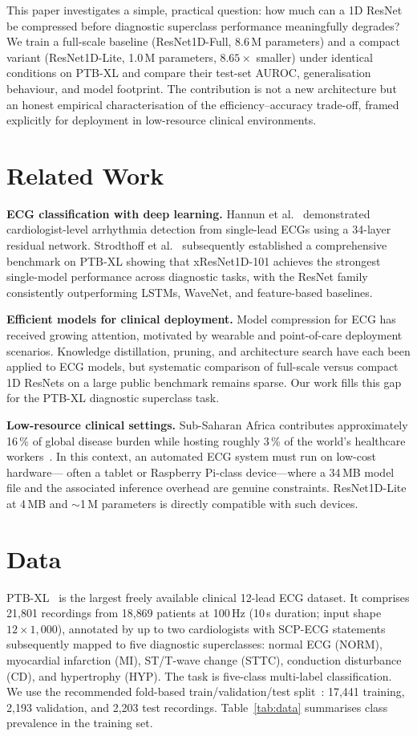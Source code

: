 \documentclass[11pt]{article}
\begin{document}
This paper investigates a simple, practical question: how much can a 1D
ResNet be compressed before diagnostic superclass performance meaningfully
degrades? We train a full-scale baseline (ResNet1D-Full, 8.6\,M parameters)
and a compact variant (ResNet1D-Lite, 1.0\,M parameters, $8.65\times$
smaller) under identical conditions on PTB-XL and compare their test-set
AUROC, generalisation behaviour, and model footprint. The contribution is
not a new architecture but an honest empirical characterisation of the
efficiency--accuracy trade-off, framed explicitly for deployment in
low-resource clinical environments.

\section{Related Work}
\textbf{ECG classification with deep learning.} Hannun et
al.~\cite{hannun2019} demonstrated cardiologist-level arrhythmia detection
from single-lead ECGs using a 34-layer residual network. Strodthoff et
al.~\cite{strodthoff2021} subsequently established a comprehensive benchmark
on PTB-XL showing that xResNet1D-101 achieves the strongest single-model
performance across diagnostic tasks, with the ResNet family consistently
outperforming LSTMs, WaveNet, and feature-based baselines.

\noindent\textbf{Efficient models for clinical deployment.}
Model compression for ECG has received growing attention, motivated by
wearable and point-of-care deployment scenarios. Knowledge distillation,
pruning, and architecture search have each been applied to ECG models,
but systematic comparison of full-scale versus compact 1D ResNets on a
large public benchmark remains sparse. Our work fills this gap for the
PTB-XL diagnostic superclass task.

\noindent\textbf{Low-resource clinical settings.}
Sub-Saharan Africa contributes approximately 16\,\% of global disease
burden while hosting roughly 3\,\% of the world's healthcare workers~\cite{who2021}.
In this context, an automated ECG system must run on low-cost hardware---
often a tablet or Raspberry Pi-class device---where a 34\,MB model file and
the associated inference overhead are genuine constraints. ResNet1D-Lite
at 4\,MB and $\sim$1\,M parameters is directly compatible with such devices.

\section{Data}
PTB-XL~\cite{wagner2020ptbxl} is the largest freely available clinical
12-lead ECG dataset. It comprises 21{,}801 recordings from 18{,}869 patients
at 100\,Hz (10\,s duration; input shape $12\times1{,}000$), annotated by
up to two cardiologists with SCP-ECG statements subsequently mapped to five
diagnostic superclasses: normal ECG (NORM), myocardial infarction (MI),
ST/T-wave change (STTC), conduction disturbance (CD), and hypertrophy (HYP).
The task is five-class multi-label classification. We use the recommended
fold-based train/validation/test split~\cite{strodthoff2021}:
17{,}441 training, 2{,}193 validation, and 2{,}203 test recordings.
Table~\ref{tab:data} summarises class prevalence in the training set.
\end{document}
